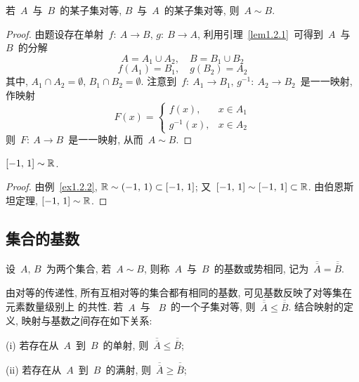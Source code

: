 \begin{theorem} \label{Bernstein} 
若~$A$~与~$B$~的某子集对等, $B$~与~$A$~的某子集对等, 则~$A \sim B$.
\end{theorem}

\begin{proof}
由题设存在单射~$f: \: A \rightarrow B, \, g: \: B \rightarrow A$, 利用引理~\ref{lem1.2.1}~可得到~$A$~与~$B$~的分解
\[
A = A_1 \cup A_2, \quad B = B_1 \cup B_2
\]
\[
f(A_1) = B_1, \quad g(B_2) = A_2
\]
其中, $A_1 \cap A_2 = \emptyset, \, B_1 \cap B_2 = \emptyset$. 注意到~$f: \: A_1 \rightarrow B_1, \, g^{-1}: \: A_2 \rightarrow B_2$~是一一映射, 作映射
\[
F(x) = \left\{\!\!
\begin{array}{ll}
f(x), & x \in A_1 \\
g^{-1}(x), & x \in A_2
\end{array}
\right.
\]
则~$F: \: A \rightarrow B$~是一一映射, 从而~$A \sim B$.
\end{proof}

\medskip

\begin{example} \label{ex1.2.4}
$[-1,\,1] \sim \mathbb{R}$.
\end{example}

\begin{proof}
由例~\ref{ex1.2.2}, $\mathbb{R} \sim (-1,\,1) \subset [-1,\,1]$; 又~$[-1,\,1] \sim [-1,\,1] \subset \mathbb{R}$. 由伯恩斯坦定理, $[-1,\,1] \sim \mathbb{R}$.
\end{proof}

\subsection{集合的基数}

\begin{definition}
设~$A, \, B$~为两个集合, 若~$A \sim B$, 则称~$A$~与~$B$~的基数或势相同, 记为~$\overline{\overline A} = \overline{\overline B}$.
\end{definition}

由对等的传递性, 所有互相对等的集合都有相同的基数, 可见基数反映了对等集在元素数量级别上
的共性. 若~$A$~与
~$B$~的一个子集对等, 则~$\overline{\overline A} \leqslant \overline{\overline B}$. 结合映射的定义,  映射与基数之间存在如下关系:

(i) 若存在从~$A$~到~$B$~的单射, 则~$\overline{\overline A} \leqslant \overline{\overline B}$;

(ii) 若存在从~$A$~到~$B$~的满射, 则~$\overline{\overline A} \geqslant \overline{\overline B}$;

